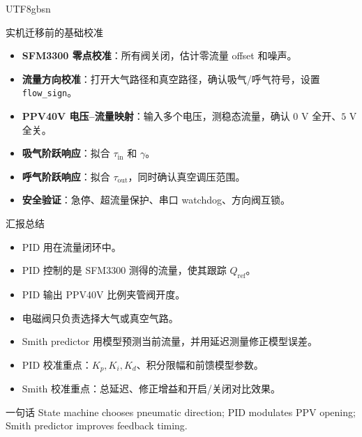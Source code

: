 \documentclass[aspectratio=169,10pt]{beamer}
\newcommand{\code}[1]{\texttt{\small #1}}
\begin{document}
\begin{CJK*}{UTF8}{gbsn}
\begin{frame}{实机迁移前的基础校准}
  \begin{itemize}
    \item \textbf{SFM3300 零点校准}：所有阀关闭，估计零流量 offset 和噪声。
    \item \textbf{流量方向校准}：打开大气路径和真空路径，确认吸气/呼气符号，设置 \code{flow\_sign}。
    \item \textbf{PPV40V 电压--流量映射}：输入多个电压，测稳态流量，确认 $0$ V 全开、$5$ V 全关。
    \item \textbf{吸气阶跃响应}：拟合 $\tau_{\mathrm{in}}$ 和 $\gamma$。
    \item \textbf{呼气阶跃响应}：拟合 $\tau_{\mathrm{out}}$，同时确认真空调压范围。
    \item \textbf{安全验证}：急停、超流量保护、串口 watchdog、方向阀互锁。
  \end{itemize}
\end{frame}

\begin{frame}{汇报总结}
  \begin{itemize}
    \item PID 用在流量闭环中。
    \item PID 控制的是 SFM3300 测得的流量，使其跟踪 $Q_{\mathrm{ref}}$。
    \item PID 输出 PPV40V 比例夹管阀开度。
    \item 电磁阀只负责选择大气或真空气路。
    \item Smith predictor 用模型预测当前流量，并用延迟测量修正模型误差。
    \item PID 校准重点：$K_p,K_i,K_d$、积分限幅和前馈模型参数。
    \item Smith 校准重点：总延迟、修正增益和开启/关闭对比效果。
  \end{itemize}

  \vspace{0.6em}
  \begin{block}{一句话}
    State machine chooses pneumatic direction; PID modulates PPV opening; Smith predictor improves feedback timing.
  \end{block}
\end{frame}

\end{CJK*}
\end{document}
